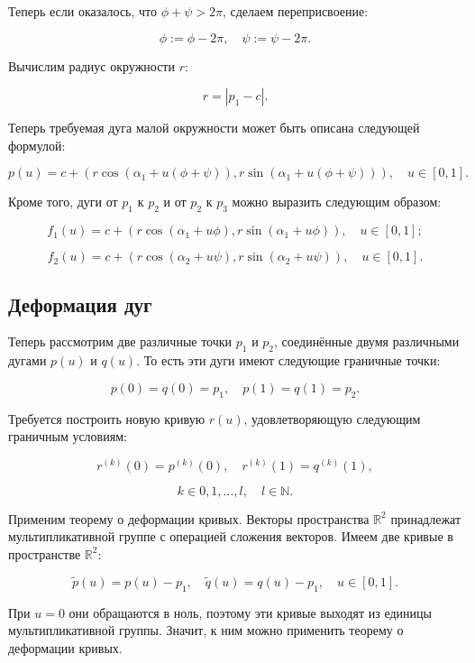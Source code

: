 Теперь если оказалось, что $\phi+\psi>2\pi$, сделаем переприсвоение:

\begin{equation}
\phi:=\phi-2\pi, \quad \psi:=\psi-2\pi.
\label{angle-correction}
\end{equation}

Вычислим радиус окружности $r$:

$$
r=|p_1-c|.
$$

Теперь требуемая дуга малой окружности может быть описана следующей формулой:

$$
p(u)=c+(r\cos(\alpha_1+u(\phi+\psi)),r\sin(\alpha_1+u(\phi+\psi))), \quad u \in [0,1].
$$

Кроме того, дуги от $p_1$ к $p_2$ и от $p_2$ к $p_3$ можно выразить следующим образом:

\begin{equation}
f_1(u)=c+(r\cos(\alpha_1+u\phi),r\sin(\alpha_1+u\phi)), \quad u \in [0,1];
\label{arc-phi}
\end{equation}

\begin{equation}
f_2(u)=c+(r\cos(\alpha_2+u\psi),r\sin(\alpha_2+u\psi)), \quad u \in [0,1].
\label{arc-psi}
\end{equation}

\subsection*{Деформация дуг}

Теперь рассмотрим две различные точки $p_1$ и $p_2$, соединённые двумя различными дугами $p(u)$ и $q(u)$. То есть эти
дуги имеют следующие граничные точки:

$$
p(0)=q(0)=p_1, \quad p(1)=q(1)=p_2.
$$

Требуется построить новую кривую $r(u)$, удовлетворяющую следующим граничным условиям:

$$
r^{(k)}(0)=p^{(k)}(0), \quad r^{(k)}(1)=q^{(k)}(1),
$$

$$
k \in {0,1,\dots,l}, \quad l \in \mathbb{N}.
$$

Применим теорему о деформации кривых. Векторы пространства $\mathbb{R}^2$ принадлежат мультипликативной группе с
операцией сложения векторов. Имеем две кривые в пространстве $\mathbb{R}^2$:

$$
\tilde p(u)=p(u)-p_1, \quad \tilde q(u)=q(u)-p_1, \quad u \in [0,1].
$$

При $u=0$ они обращаются в ноль, поэтому эти кривые выходят из единицы мультипликативной группы. Значит, к ним можно
применить теорему о деформации кривых.

